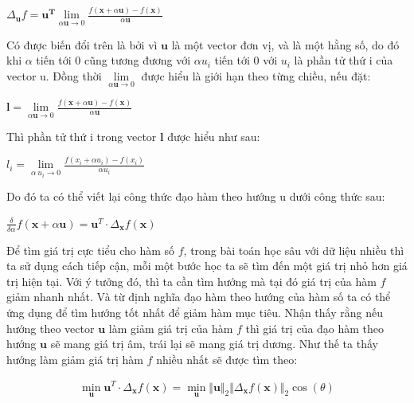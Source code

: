 \documentclass[fontsize=12pt]{scrartcl}
\begin{document}
\begin{center}
$\Delta_{\boldsymbol{u}} f = \boldsymbol{u^T} \lim\limits_{\alpha\boldsymbol{u}\rightarrow 0}\frac{f(\boldsymbol{x}+\alpha \boldsymbol{u}) - f(\boldsymbol{x})}{\alpha\boldsymbol{u}}$
\end{center}
Có được biến đổi trên là bởi vì $\boldsymbol{u}$ là một vector đơn vị, và là một hằng số, do đó khi $\alpha$ tiến tới 0 cũng tương đương với $\alpha u_i$ tiến tới 0 với $u_i$ là phần tử thứ i của vector u. Đồng thời $\lim\limits_{\alpha\boldsymbol{u}\rightarrow 0}$ được hiểu là giới hạn theo từng chiều, nếu đặt:
\begin{center}
$\boldsymbol{l} =  \lim\limits_{\alpha\boldsymbol{u}\rightarrow 0}\frac{f(\boldsymbol{x}+\alpha \boldsymbol{u}) - f(\boldsymbol{x})}{\alpha\boldsymbol{u}}$
\end{center}
Thì phần tử thứ i trong vector $\boldsymbol{l}$ được hiểu như sau:
\begin{center}
$l_i = \lim\limits_{\alpha\ u_i\rightarrow 0}\frac{f(x_i+\alpha u_i) - f(x_i)}{\alpha u_i}$
\end{center}
Do đó ta có thể viết lại công thức đạo hàm theo hướng u dưới công thức sau: 
\begin{center}
$\frac{\delta}{\delta\alpha}f(\boldsymbol{x}+\alpha \boldsymbol{u}) = \boldsymbol{u}^T\cdot\Delta_{\boldsymbol{x}}f(\boldsymbol{x})$
\end{center}
\par
Để tìm giá trị cực tiểu cho hàm số $f$, trong bài toán học sâu với dữ liệu nhiều thì ta sử dụng cách tiếp cận, mỗi một bước học ta sẽ tìm đến một giá trị nhỏ hơn giá trị hiện tại. Với ý tưởng đó, thì ta cần tìm hướng mà tại đó giá trị của hàm $f$ giảm nhanh nhất. Và từ định nghĩa đạo hàm theo hướng của hàm số  ta có thể ứng dụng để tìm hướng tốt nhất để giảm hàm mục tiêu. Nhận thấy rằng nếu hướng theo vector $\boldsymbol{u}$ làm giảm giá trị của hàm $f$ thì giá trị của đạo hàm theo hướng $\boldsymbol{u}$ sẽ mang giá trị âm, trái lại sẽ mang giá trị dương. Như thế ta thấy hướng làm giảm giá trị hàm $f$ nhiều nhất sẽ được tìm theo:
\begin{center}
\begin{align}\label{formulation:cthuc}
\min_{\boldsymbol{u}}\boldsymbol{u}^T\cdot\Delta_{\boldsymbol{x}}f(\boldsymbol{x})
 = \displaystyle\min_{\boldsymbol{u}}\Vert\boldsymbol{u}\Vert_2\Vert\Delta_{\boldsymbol{x}}f(\boldsymbol{x})\Vert_2\cos(\theta)\end{align}
\end{center}
\end{document}
